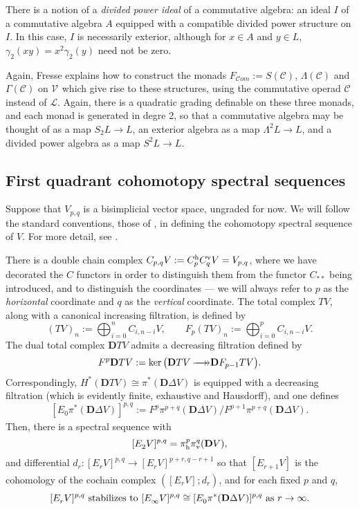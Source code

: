 \documentclass[11pt]{amsart}
\theoremstyle{plain}
\theoremstyle{definition}
\renewcommand{\ker}{\textup{ker}\,}
\renewcommand{\to}{\longrightarrow}
\newcommand{\scrL}{\mathscr{L}}
\newcommand{\scrC}{\mathscr{C}}
\newcommand{\calV}{\mathcal{V}}
\theoremstyle{plain}
\newcommand{\LieOperad}{{\scrL}}
\newcommand{\CommOperad}{{\scrC}}
\newcommand{\vect}[2]{\calV^{#1}_{#2}}
\newcommand{\epi}{{\,\makebox[0cm][l]{\ensuremath\to}\to}}
\newcommand{\algs}{{\scrC\!\textit{om}}}
\newcommand{\E}[5]{[E^{#1}_{#2}#3]^{#4}_{#5}}
\newcommand{\uver}{^\textup{v}}
\newcommand{\uhor}{^\textup{h}}
\newcommand{\dver}{_\textup{v}}
\newcommand{\dhor}{_\textup{h}}
\newcommand{\diag}{\Delta}
\newcommand{\dual}{\mathbf{D}}
\begin{document}
\begin{Conventions and notation}
There is a notion of a \emph{divided power ideal} of a commutative algebra: an ideal $I$ of a commutative algebra $A$ equipped with a compatible divided power structure on $I$. In this case, $I$ is necessarily exterior, although for $x\in A$ and $y\in L$, $\gamma_2(xy)=x^2\gamma_2(y)$ need not be zero.

Again, Fresse \cite{FresseSimplicialAlgs.pdf} explains how to construct the monads $F_{\algs}:=S(\CommOperad)$, $\Lambda(\CommOperad)$ and $\Gamma(\CommOperad)$ on $\vect{}{}$ which give rise to these structures, using the commutative operad $\CommOperad$ instead of $\LieOperad$. Again, there is a quadratic grading definable on these three monads, and each monad is generated in degre 2, so that a commutative algebra may be thought of as a  map $S_2L\to L$, an exterior algebra as a map $\Lambda^2L\to L$, and a divided power algebra as a map $S^2L\to L$.



















\subsection{First quadrant cohomotopy spectral sequences}
Suppose that $V_{p,q}$ is a bisimplicial vector space, ungraded for now. We will follow the standard conventions, those of \cite{MR2245560}, in defining the cohomotopy spectral sequence of $V$. For  more detail, see \cite[\S1.15{}]{MR2245560}.   

There is a double chain complex $C_{p,q}V:=C\uhor_p C\uver_q V=V_{p,q}$, where we have decorated the $C$ functors in order to distinguish them from the functor $C_{**}$ being introduced, and to distinguish the coordinates --- we will always refer to $p$ as the \emph{horizontal} coordinate and $q$ as the \emph{vertical} coordinate. The total complex $TV$, along with a canonical increasing filtration, is defined by 
\[(TV)_n:=\bigoplus_{i=0}^{n}C_{i,n-i}V,\qquad F_p(TV)_n:=\bigoplus_{i=0}^{p}C_{i,n-i}V.\]
The dual total complex $\dual TV$ admits a decreasing filtration defined by
\[F^p\dual TV:=\ker\bigl(\dual TV\epi \dual F_{p-1} TV\bigr).\]
Correspondingly, $H^*(\dual TV)\cong \pi^*(\dual\diag V)$ is equipped with a decreasing filtration (which is evidently finite, exhaustive and Hausdorff), and one defines
\[\E{}{0}{\pi^*(\dual\diag V)}{p,q}{}:=F^{p}\pi^{p+q}(\dual\diag V)/F^{p+1}\pi^{p+q}(\dual\diag V).\]
Then, there is a spectral sequence with
\[\E{}{2}{V}{p,q}{}=\pi\dhor^{p}\pi\dver^{q}(\dual V),\]
and differential $d_r:\E{}{r}{V}{p,q}{}\to \E{}{r}{V}{p+r,q-r+1}{}$ so that $\E{}{r+1}{V}{}{}$ is the cohomology of the cochain complex $(\E{}{r}{V}{}{};d_r)$, and for each fixed $p$ and $q$,
\[\E{}{r}{V}{p,q}{}\textup{ stabilizes to }\E{}{\infty}{V}{p,q}{}\cong \E{}{0}{\pi^*(\dual\diag V)}{p,q}{}\textup{ as $r\rightarrow\infty$}.\]


\end{Conventions and notation}
\end{document}
